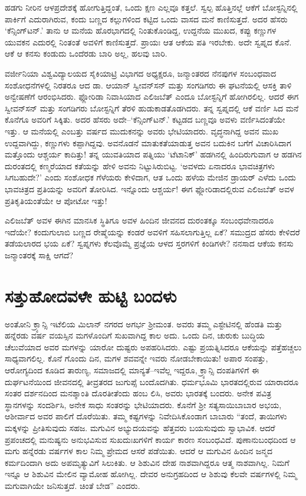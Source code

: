 ಹಡಗು ನೀರಿನ ಆಳಪ್ರದೇಶಕ್ಕೆ ಹೋಗುತ್ತಿದ್ದಂತೆ, ಒಂದು ಕ್ಷಣ ಎಲ್ಲವೂ ಕತ್ತಲೆ. ಸ್ವಲ್ಪ ಹೊತ್ತಿನಲ್ಲೆ ಆಕೆಗೆ ಬೋಸ್ಟನ್ನಿನಲ್ಲಿ ಪಾರ್ಕಿಗೆ ಎದುರಾಗಿರುವ, ಕಂದು ಬಣ್ಣದ ಕಲ್ಲುಗಳಿಂದ ಕಟ್ಟಿದ ಒಂದು ವಾಸದ ಮನೆ ಕಾಣಿಸುತ್ತದೆ. ಅದರ ಹೆಸರು ‘ಕೆನ್ಸಿಂಗ್​ಟನ್.’ ತಾನು ಆ ಮನೆಯ ಹೊರಭಾಗದಲ್ಲಿ ನಿಂತುಕೊಂಡಿದ್ದ, ಉದ್ದನೆಯ ಮುಖದ, ಕಪ್ಪು ಕಣ್ಣುಗಳ ಯುವಕನ ಎದುರಲ್ಲಿ ನಿಂತಂತೆ ಅವಳಿಗೆ ಕಾಣಿಸುತ್ತದೆ. ಪ್ರಾಯಃ ಆತ ಆಕೆಯ ಪತಿ ಇರಬೇಕು. ಅದೇ ಸ್ವಪ್ನದ ಕೊನೆ. ಆಕೆ ಆ ಕನಸು ಕಂಡುದು ಒಂದೆರಡು ಬಾರಿ ಅಲ್ಲ, ಹಲವು ಬಾರಿ.

ವರ್ಜೀನಿಯಾ ವಿಶ್ವವಿದ್ಯಾಲಯದ ಸೈಕಿಯಾಟ್ರಿ ವಿಭಾಗದ ಅಧ್ಯಕ್ಷರೂ, ಜನ್ಮಾಂತರದ ನೆನಪುಗಳ ಸಂಬಂಧವಾದ ಸಂಶೋಧನೆಗಳಲ್ಲಿ ನಿರತರೂ ಆದ ಡಾ. ಆಯಾನ್ ಸ್ವೀವನ್​ಸನ್ ಮತ್ತು ಸಂಗಡಿಗರು ಈ ಘಟನೆಯಲ್ಲಿ ಆಸಕ್ತಿ ತಾಳಿ ಅನ್ವೇಷಣೆಗೆ ಆರಂಭಿಸಿದರು. ಫ್ಲೋರಿಡಾ ನಿವಾಸಿಯಾದ ಎಲಿಜಬೆತ್ ಎಂದೂ ಬೋಸ್ಟನ್ನಿಗೆ ಹೋಗಿರಲಿಲ್ಲ. ಆದರೆ ಈಗ ಸ್ವೀವನ್​ಸನ್ ಮತ್ತು ಸಂಗಡಿಗರು ಬೋಸ್ಟನ್ನಿಗೆ ತೆರಳಿ ಹುಡುಕಾಡತೊಡಗಿದರು. ತನ್ನ ಸ್ವಪ್ನದಲ್ಲಿ ಆಕೆ ವರ್ಣಿ ಸಿದ ಮನೆ ಕೊನೆಗೂ ಅವರಿಗೆ ಸಿಕ್ಕಿತು. ಅದರ ಹೆಸರು ಅದೇ–‘ಕೆನ್ಸಿಂಗ್​ಟನ್.’ ಕಟ್ಟಡದ ಬಣ್ಣವೂ ಅವಳು ವರ್ಣಿಸಿದಂತೆಯೇ ಇತ್ತು. ಆ ಮನೆಯಲ್ಲಿ ಎಂಬತ್ತು ವರ್ಷದ ಮುದುಕನನ್ನು ಅವರು ಭೇಟಿಯಾದರು. ವೃದ್ಧನಾಗಿದ್ದ ಅವನ ಮುಖ ಉದ್ದವಾಗಿದ್ದು, ಕಣ್ಣುಗಳು ಕಪ್ಪಾಗಿದ್ದವು. ಅವನೊಡನೆ ಮಾತುಕತೆಯಾಡುತ್ತ ಅವನ ಬದುಕಿನ ಬಗೆಗೆ ವಿಚಾರಿಸಿದಾಗ ಮತ್ತೊಂದು ಆಶ್ಚರ್ಯ ಕಾದಿತ್ತು! ತನ್ನ ಯುವತಿಯಾದ ಪತ್ನಿಯು ‘ಟೆಟಾನಿಕ್​’ ಹಡಗಿನಲ್ಲಿ ಹಿಂದಿರುಗುವಾಗ ಆ ಹಡಗಿನ ದುರಂತದಲ್ಲಿ ಕಣ್ಮರೆಯಾದ ಕತೆಯನ್ನು ಹೇಳಿ ಅವನು ನಿಟ್ಟುಸಿರುಬಿಟ್ಟ. ‘ಅವಳದು ಏನಾದರೂ ಭಾವಚಿತ್ರಗಳು ಸಿಗಬಹುದೇ?’ ಎಂದು ಸಂಶೋಧಕ ಗೆಳೆಯರು ಕೇಳಿದಾಗ, ಆತ ಒಂದು ಹಳೆಯ ಮೇಜಿನ ಡ್ರಾಯರ್ ಎಳೆದು ಒಂದು ಭಾವಚಿತ್ರದ ಪ್ರತಿಯನ್ನು ಅವರಿಗೆ ತೋರಿಸಿದ. ಇನ್ನೊಂದು ಆಶ್ಚರ್ಯ! ಈಗ ಫ್ಲೋರಿಡಾದಲ್ಲಿರುವ ಎಲಿಜಬೆತ್ ಅವಳ ಪ್ರತಿಕೃತಿಯಂತೆಯೇ ಆ ಪೋಟೋ ಇತ್ತು!

ಎಲಿಜಬೆತ್ ಅವಳ ಈಗಿನ ಮಾನಸಿಕ ಸ್ಥಿತಿಗೂ ಅವಳ ಹಿಂದಿನ ಜೀವನದ ದುರಂತಕ್ಕೂ ಸಂಬಂಧವೇನಾದರೂ ಇದೆಯೇ? ಕಂದುಗುಲಾಬಿ ಬಣ್ಣದ ರೇಷ್ಮೆಯನ್ನು ಕಂಡರೆ ಅವಳಿಗೆ ಸಹಿಸಲಾಗುತ್ತಿಲ್ಲ ಏಕೆ? ಸಮುದ್ರದ ಹೆಸರು ಕೇಳಿದರೆ ತಡೆಯಲಾರದ ಭಯ ಏಕೆ? ಸ್ವಪ್ನಗಳು ಕೆಲವೊಮ್ಮೆ ಪ್ರಜ್ಞೆಯ ಆಳದ ಸ್ತರಗಳಿಗೆ ಕಿಂಡಿಗಳೇ? ನನಸಾದ ಆಕೆಯ ಕನಸು ಜನ್ಮಾಂತರಕ್ಕೆ ಸಾಕ್ಷಿ ಆಗದೆ?


\section{ಸತ್ತುಹೋದವಳೇ ಹುಟ್ಟಿ ಬಂದಳು}

ಅಂತೋನಿ ಕ್ರ್ಯಾನ್ಸಿ ಇಟೆಲಿಯ ಮಿಲಾನ್ ನಗರದ ಅಗರ್ಭ ಶ‍್ರೀಮಂತ. ಅವರು ತಮ್ಮ ಎಸ್ಟೇಟಿನಲ್ಲಿ ಹೆಂಡತಿ ಮತ್ತು ಹನ್ನೆರಡು ವರ್ಷ ವಯಸ್ಸಿನ ಮಗಳೊಂದಿಗೆ ಸುಖವಾಗಿದ್ದ ಕಾಲ ಅದು. ಒಂದು ದಿನ, ಚುರುಕು ಬುದ್ಧಿಯ ಚೆಲುವೆಯಾದ ಅವರ ಮಗಳನ್ನು ಯಾರೋ ದುಷ್ಟರು ಅಪಹರಿಸಿದರು. ಎಷ್ಟು ಪ್ರಯತ್ನಿಸಿದರೂ ಆಕೆಯನ್ನು ಪತ್ತೆಹಚ್ಚಲು ಸಾಧ್ಯವಾಗಲಿಲ್ಲ. ಕೊನೆ ಗೊಂದು ದಿನ, ಮಗಳ ಶವವನ್ನೇ ಇವರು ನೋಡಬೇಕಾಯಿತು! ಅಪಾರ ಸಂಪತ್ತು, ಆರೋಗ್ಯದಿಂದ ಕೂಡಿದ ತಾರುಣ್ಯ, ಸಮಾಜದಲ್ಲಿ ಮಾನ್ಯತೆ–ಇವೆಲ್ಲ ಇದ್ದರೂ, ಕ್ರ್ಯಾನ್ಸಿ ದಂಪತಿಗಳಿಗೆ ಈ ದುರ್ಘಟನೆಯಿಂದ ಜೀವನದಲ್ಲಿ ತೀವ್ರತರದ ಜುಗುಪ್ಸೆ ಬಂದೊದಗಿತು. ಧರ್ಮಭೂಮಿ ಭಾರತದಲ್ಲಿರುವ ಯಾರಾದರೂ ಸಂತರ ದರ್ಶನದಿಂದ ಮನಶ್ಶಾಂತಿ ದೊರತೀತೆಂದು ಹಂಬ ಲಿಸಿ, ಅವರು ಭಾರತಕ್ಕೆ ಬಂದರು. ಅನೇಕ ಪವಿತ್ರ ಸ್ಥಾನಗಳನ್ನು ಸಂದರ್ಶಿಸಿ, ಅನೇಕ ಸಾಧು ಸಂತರನ್ನು ಭೇಟಿಯಾದರು. ಕೊನೆಗೆ ಶ‍್ರೀ ಸತ್ಯಸಾಯಿಬಾಬಾರ ಅಭಯ, ಆಶೀರ್ವಾದ ಅವರ ಪಾಲಿಗೆ ದೊರೆಯಿತು. ತಮ್ಮ ಕಷ್ಟಗಳನ್ನು ನಿವೇದಿಸಿಕೊಂಡಾಗ ಬಾಬಾರು “ತಂದೆ, ತಾಯಿಗಳು ಮಕ್ಕಳನ್ನು ಪ್ರೀತಿಸುವುದು ಸಹಜ. ಮಗುವಿನ ಅಭ್ಯುದಯವನ್ನು ಹೆತ್ತವರು ಬಯಸುವುದು ಸ್ವಾಭಾವಿಕ. ಆದರೆ ಪ್ರಪಂಚದಲ್ಲಿ ಮನುಷ್ಯನು ಅನುಭವಿಸುವ ಸುಖದುಃಖಗಳಿಗೆ ಕಾರ್ಯ ಕಾರಣ ಸಂಬಂಧವಿದೆ. ಪುಣಾನುಬಂಧದಿಂದ ಆ ಮಗು ಹನ್ನೆರಡು ವರ್ಷಗಳ ಕಾಲ ನಿಮ್ಮ ಪ್ರೇಮದ ಆಸರೆ ಪಡೆಯಿತು. ಆದರೆ ಆ ಮಗುವಿನ ಹಿಂದಿನ ಜನ್ಮದ ಕರ್ಮದಿಂದಾಗಿ ಅದು ಅಪಮೃತ್ಯುವಿಗೆ ಸಿಲುಕಿತು. ಆ ಶಿಶುವಿನ ದೇಹ ನಾಶವಾಗಿದ್ದರೂ ಆತ್ಮ ನಾಶವಾಗಿಲ್ಲ. ನಿಮಗೆ ಇನ್ನೂ ಆ ಶಿಶುವಿನ ಮೇಲಿನ ವ್ಯಾಮೋಹ ಹೋಗಿಲ್ಲ. ದೇವರ ಅನುಗ್ರಹದಿಂದ ಆ ಶಿಶುವು ಕೆಲವೇ ವರ್ಷಗಳಲ್ಲಿ ನಿಮ್ಮ ಮಗುವಾಗಿಯೇ ಜನಿಸುತ್ತದೆ. ಚಿಂತೆ ಬೇಡ” ಎಂದರು.

